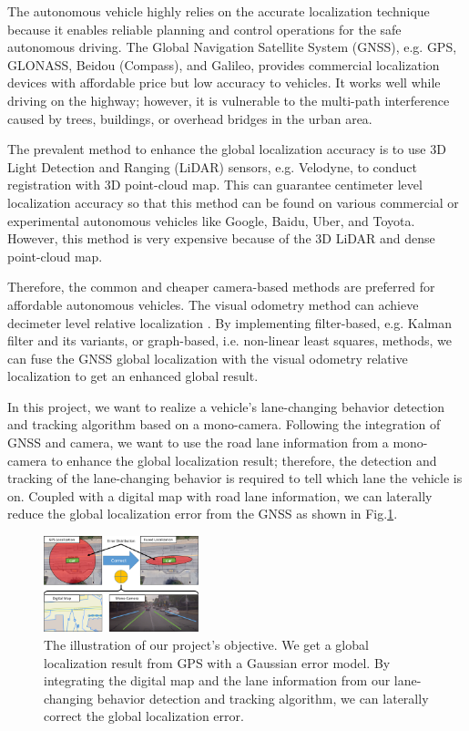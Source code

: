 \documentclass[10pt,twocolumn,letterpaper]{article}
\begin{document}
The autonomous vehicle highly relies on the accurate localization technique because it enables reliable planning and control operations for the safe autonomous driving. The Global Navigation Satellite System (GNSS), e.g. GPS, GLONASS, Beidou (Compass), and Galileo, provides commercial localization devices with affordable price but low accuracy to vehicles. It works well while driving on the highway; however, it is vulnerable to the multi-path interference caused by trees, buildings, or overhead bridges in the urban area.

The prevalent method to enhance the global localization accuracy is to use 3D Light Detection and Ranging (LiDAR) sensors, e.g. Velodyne, to conduct registration with 3D point-cloud map. This can guarantee centimeter level localization accuracy \cite{takeuchi20063} so that this method can be found on various commercial or experimental autonomous vehicles like Google, Baidu, Uber, and Toyota. However, this method is very expensive because of the 3D LiDAR and dense point-cloud map.

Therefore, the common and cheaper camera-based methods are preferred for affordable autonomous vehicles. The visual odometry method can achieve decimeter level relative localization \cite{merfels2016pose}. By implementing filter-based, e.g. Kalman filter and its variants, or graph-based, i.e. non-linear least squares, methods, we can fuse the GNSS global localization with the visual odometry relative localization to get an enhanced global result.

In this project, we want to realize a vehicle's lane-changing behavior detection and tracking algorithm based on a mono-camera. Following the integration of GNSS and camera, we want to use the road lane information from a mono-camera to enhance the global localization result; therefore, the detection and tracking of the lane-changing behavior is required to tell which lane the vehicle is on. Coupled with a digital map with road lane information, we can laterally reduce the global localization error from the GNSS as shown in Fig.\ref{fig:intro}.

\begin{figure}[t]
	\centering
	\includegraphics[width=0.4\textwidth]{./img/intro.png}
	\caption{The illustration of our project's objective. We get a global localization result from GPS with a Gaussian error model. By integrating the digital map and the lane information from our lane-changing behavior detection and tracking algorithm, we can laterally correct the global localization error.}
	\label{fig:intro}
\end{figure}
\end{document}
